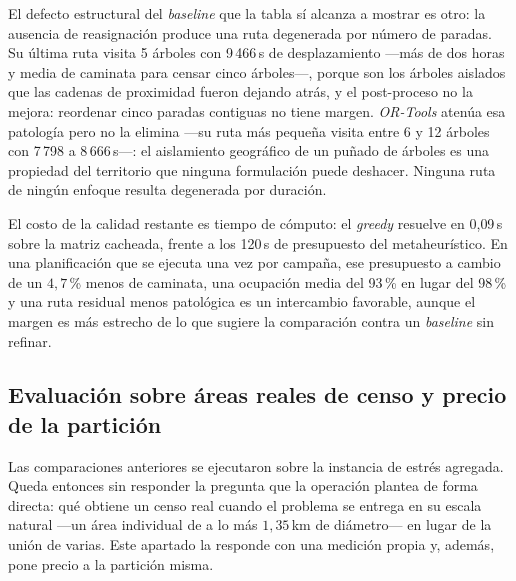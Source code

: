 El defecto estructural del \textit{baseline} que la tabla sí alcanza a mostrar es otro: la ausencia
de reasignación produce una ruta degenerada por número de paradas. Su última ruta visita 5 árboles
con 9\,466\,s de desplazamiento ---más de dos horas y media de caminata para censar cinco
árboles---, porque son los árboles aislados que las cadenas de proximidad fueron dejando atrás, y
el post-proceso no la mejora: reordenar cinco paradas contiguas no tiene margen. \textit{OR-Tools}
atenúa esa patología pero no la elimina ---su ruta más pequeña visita entre 6 y 12 árboles con
7\,798 a 8\,666\,s---: el aislamiento geográfico de un puñado de árboles es una propiedad del
territorio que ninguna formulación puede deshacer. Ninguna ruta de ningún enfoque resulta
degenerada por duración.

El costo de la calidad restante es tiempo de cómputo: el \textit{greedy} resuelve en 0{,}09\,s
sobre la matriz cacheada, frente a los 120\,s de presupuesto del metaheurístico. En una
planificación que se ejecuta una vez por campaña, ese presupuesto a cambio de un $4{,}7$\,\% menos
de caminata, una ocupación media del 93\,\% en lugar del 98\,\% y una ruta residual menos
patológica es un intercambio favorable, aunque el margen es más estrecho de lo que sugiere la
comparación contra un \textit{baseline} sin refinar.

\subsection{Evaluación sobre áreas reales de censo y precio de la partición}
\label{sec:areas-reales}

Las comparaciones anteriores se ejecutaron sobre la instancia de estrés agregada. Queda entonces
sin responder la pregunta que la operación plantea de forma directa: qué obtiene un censo real
cuando el problema se entrega en su escala natural ---un área individual de a lo más
$1{,}35$\,km de diámetro--- en lugar de la unión de varias. Este apartado la responde con una medición
propia y, además, pone precio a la partición misma.

